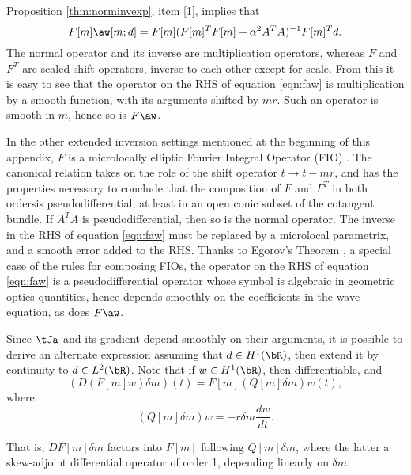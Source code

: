 Proposition \ref{thm:norminvexp}, item [1], implies that
\begin{equation}
  \label{eqn:faw}
  F[m]\aw[m;d] = F[m](F[m]^TF[m] + \alpha^2 A^TA)^{-1}F[m]^T d.
\end{equation}
The normal operator and its inverse are multiplication
operators, whereas $F$ and $F^T$ are scaled shift operators, inverse
to each other except for scale. From this it is easy to see that the
operator on the RHS of equation \ref{eqn:faw} is multiplication by a
smooth function, with its arguments shifted by $mr$. Such an operator
is smooth in $m$, hence so is $F\aw$.

In the other extended inversion settings mentioned at the beginning of
this appendix, $F$ is a microlocally elliptic Fourier Integral
Operator (FIO) \cite[]{Dui:95}. The canonical relation takes on the role
of the shift operator $t \rightarrow t-mr$, and has the properties
necessary to conclude that the composition of $F$ and $F^T$ in both
ordersis pseudodifferential, at least in an open conic subset of the
cotangent bundle. If $A^TA$ is pseudodifferential, then so is the
normal operator. The inverse in the RHS of equation \ref{eqn:faw} must
be replaced by a microlocal parametrix, and a smooth error added to
the RHS. Thanks to Egorov's Theorem \cite[]{Tay:81}, a special case of
the rules for composing FIOs, the operator on the RHS of equation
\ref{eqn:faw} is a pseudodifferential operator whose symbol is
algebraic in geometric optics quantities, hence depends smoothly on
the coefficients in the wave equation, as does $F\aw$. 

Since $\tJa$ and its gradient depend smoothly on their arguments, it
is possible to derive an alternate expression assuming that $d \in
H^1(\bR)$, then extend it by continuity to $d \in L^2(\bR)$. Note that
if $w \in H^1(\bR)$, then
  differentiable, and 
\begin{equation}
\label{eqn:deriv}
(D(F[m]w)\delta m)(t) = F[m](Q[m]\delta m)w (t), 
\end{equation}
where 
\begin{equation}
\label{eqn:defq}
(Q[m]\delta m)w = -r\delta m \frac{dw}{dt}. 
\end{equation}

That is, $DF[m]\delta m$ factors into $F[m]$ following $Q[m]\delta m$,
where the latter a skew-adjoint differential operator of order 1,
depending linearly on $\delta m$.


